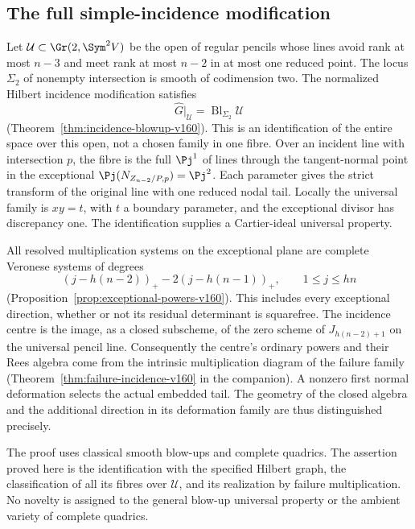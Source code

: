 \subsection{The full simple-incidence modification}
Let $\mathcal U\subset\Gr(2,\Sym^2V)$ be the open of regular pencils
whose lines avoid rank at most $n-3$ and meet rank at most $n-2$
in at most one reduced point. The locus $\Sigma_2$ of nonempty
intersection is smooth of codimension two. The normalized Hilbert
incidence modification satisfies
\[
       \widehat G|_{\mathcal U}
                 =\operatorname{Bl}_{\Sigma_2}\mathcal U
\]
(Theorem~\ref{thm:incidence-blowup-v160}). This is an identification
of the entire space over this open, not a chosen family in one fibre.
Over an incident line with intersection $p$, the fibre is the full
$\Pj^1$ of lines through the tangent-normal point in the exceptional
$\Pj(N_{Z_{n-2}/P,p})=\Pj^2$. Each parameter gives the strict
transform of the original line with one reduced nodal tail. Locally
the universal family is $xy=t$, with $t$ a boundary parameter, and
the exceptional divisor has discrepancy one. The identification
supplies a Cartier-ideal universal property.

All resolved multiplication systems on the exceptional plane are
complete Veronese systems of degrees
\[
             (j-h(n-2))_+-2(j-h(n-1))_+,
                    \qquad 1\leq j\leq hn
\]
(Proposition~\ref{prop:exceptional-powers-v160}). This includes every
exceptional direction, whether or not its residual determinant is
squarefree. The incidence centre is the image, as a closed subscheme,
of the zero scheme of $J_{h(n-2)+1}$ on the universal pencil line.
Consequently the centre's ordinary powers and their Rees algebra
come from the intrinsic multiplication diagram of the failure family
(Theorem~\ref{thm:failure-incidence-v160} in the companion).
A nonzero first normal deformation selects the actual embedded tail.
The geometry of the closed algebra and the additional direction in
its deformation family are thus distinguished precisely.

The proof uses classical smooth blow-ups and complete quadrics.
The assertion proved here is the identification with the specified
Hilbert graph, the classification of all its fibres over $\mathcal U$,
and its realization by failure multiplication. No novelty is assigned
to the general blow-up universal property or the ambient variety of
complete quadrics.

